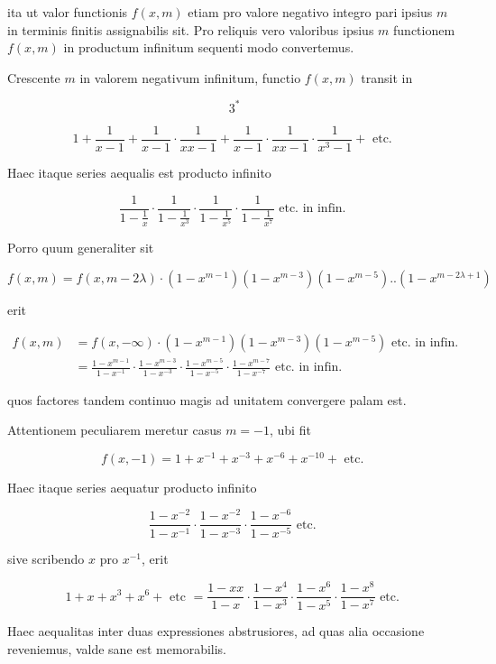 \documentclass[10pt]{article}
\begin{document}
ita ut valor functionis \(f(x, m)\) etiam pro valore negativo integro pari ipsius \(m\) in terminis finitis assignabilis sit. Pro reliquis vero valoribus ipsius \(m\) functionem \(f(x, m)\) in productum infinitum sequenti modo convertemus.

Crescente \(m\) in valorem negativum infinitum, functio \(f(x, m)\) transit in

\[
3^{*}
\]

\[
1+\frac{1}{x-1}+\frac{1}{x-1} \cdot \frac{1}{x x-1}+\frac{1}{x-1} \cdot \frac{1}{x x-1} \cdot \frac{1}{x^{3}-1}+\text { etc. }
\]

Haec itaque series aequalis est producto infinito

\[
\frac{1}{1-\frac{1}{x}} \cdot \frac{1}{1-\frac{1}{x^{3}}} \cdot \frac{1}{1-\frac{1}{x^{5}}} \cdot \frac{1}{1-\frac{1}{x^{7}}} \text { etc. in infin. }
\]

Porro quum generaliter sit

\[
f(x, m)=f(x, m-2 \lambda) \cdot\left(1-x^{m-1}\right)\left(1-x^{m-3}\right)\left(1-x^{m-5}\right) . .\left(1-x^{m-2 \lambda+1}\right)
\]

erit

\[
\begin{aligned}
f(x, m) & =f(x,-\infty) \cdot\left(1-x^{m-1}\right)\left(1-x^{m-3}\right)\left(1-x^{m-5}\right) \text { etc. in infin. } \\
& =\frac{1-x^{m-1}}{1-x^{-1}} \cdot \frac{1-x^{m-3}}{1-x^{-3}} \cdot \frac{1-x^{m-5}}{1-x^{-5}} \cdot \frac{1-x^{m-7}}{1-x^{-7}} \text { etc. in infin. }
\end{aligned}
\]

quos factores tandem continuo magis ad unitatem convergere palam est.

Attentionem peculiarem meretur casus \(m=-1\), ubi fit

\[
f(x,-1)=1+x^{-1}+x^{-3}+x^{-6}+x^{-10}+\text { etc. }
\]

Haec itaque series aequatur producto infinito

\[
\frac{1-x^{-2}}{1-x^{-1}} \cdot \frac{1-x^{-2}}{1-x^{-3}} \cdot \frac{1-x^{-6}}{1-x^{-5}} \text { etc. }
\]

sive scribendo \(x\) pro \(x^{-1}\), erit

\[
1+x+x^{3}+x^{6}+\text { etc }=\frac{1-x x}{1-x} \cdot \frac{1-x^{4}}{1-x^{3}} \cdot \frac{1-x^{6}}{1-x^{5}} \cdot \frac{1-x^{8}}{1-x^{7}} \text { etc. }
\]

Haec aequalitas inter duas expressiones abstrusiores, ad quas alia occasione reveniemus, valde sane est memorabilis.
\end{document}

